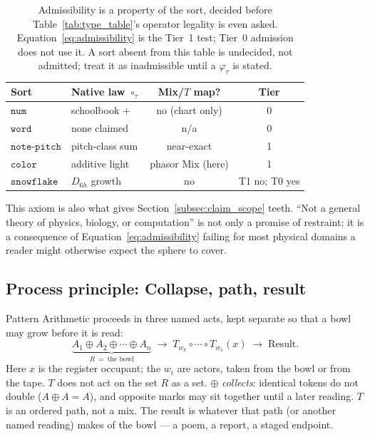 \documentclass[12pt, a4paper]{article}
\begin{document}
\begin{table}[h]
\centering
\begin{tabular}{llcc}
\hline
Sort & Native law $\circ_\tau$ & Mix/$T$ map? & Tier \\
\hline
$\mathtt{num}$   & schoolbook $+$ & no (chart only) & 0 \\
$\mathtt{word}$  & none claimed & n/a & 0 \\
$\mathtt{note\text{-}pitch}$ & pitch-class sum & near-exact & 1 \\
$\mathtt{color}$ & additive light & phasor Mix (here) & 1 \\
$\mathtt{snowflake}$ & $D_{6h}$ growth & no & T1 no; T0 yes \\
\hline
\end{tabular}
\caption{Admissibility is a property of the sort, decided before
Table~\ref{tab:type_table}'s operator legality is even asked.
Equation~\eqref{eq:admissibility} is the Tier~1 test; Tier~0
admission does not use it. A sort
absent from this table is undecided, not admitted; treat it as
inadmissible until a $\varphi_\tau$ is stated.}
\label{tab:admissibility}
\end{table}

This axiom is also what gives
Section~\ref{subsec:claim_scope} teeth. ``Not a general theory of
physics, biology, or computation'' is not only a promise of
restraint; it is a consequence of Equation~\eqref{eq:admissibility}
failing for most physical domains a reader might otherwise expect
the sphere to cover.

\subsection{Process principle: Collapse, path, result}
\label{subsec:process_principle}
Pattern Arithmetic proceeds in three named acts, kept separate so that a bowl may grow before it is read:
\begin{equation}
    \underbrace{A_1 \oplus A_2 \oplus \cdots \oplus A_n}_{R\ =\ \text{the bowl}}
    \;\longrightarrow\;
    T_{w_k}\circ \cdots \circ T_{w_1}(x)
    \;\longrightarrow\;
    \text{Result}.
    \label{eq:pipeline}
\end{equation}
Here $x$ is the register occupant; the $w_i$ are actors, taken from
the bowl or from the tape. $T$ does not act on the set $R$ as a set.
$\oplus$ \emph{collects}: identical tokens do not double ($A \oplus A = A$), and opposite marks may sit together until a later reading. $T$ is an ordered path, not a mix. The result is whatever that path (or another named reading) makes of the bowl --- a poem, a report, a staged endpoint.
\end{document}
